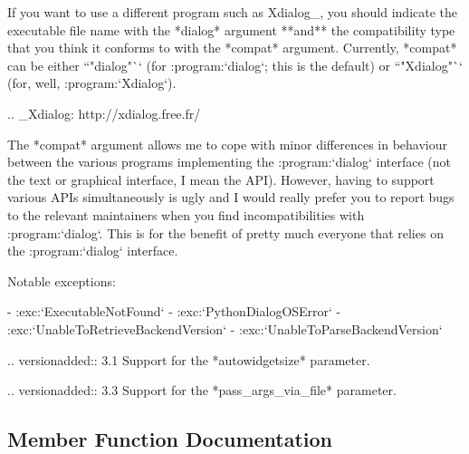 \begin{DoxyVerb}
If you want to use a different program such as Xdialog_, you
should indicate the executable file name with the *dialog*
argument **and** the compatibility type that you think it
conforms to with the *compat* argument. Currently, *compat* can
be either ``"dialog"`` (for :program:`dialog`; this is the
default) or ``"Xdialog"`` (for, well, :program:`Xdialog`).

.. _Xdialog: http://xdialog.free.fr/

The *compat* argument allows me to cope with minor differences
in behaviour between the various programs implementing the
:program:`dialog` interface (not the text or graphical
interface, I mean the API). However, having to support various
APIs simultaneously is ugly and I would really prefer you to
report bugs to the relevant maintainers when you find
incompatibilities with :program:`dialog`. This is for the
benefit of pretty much everyone that relies on the
:program:`dialog` interface.

Notable exceptions:

  - :exc:`ExecutableNotFound`
  - :exc:`PythonDialogOSError`
  - :exc:`UnableToRetrieveBackendVersion`
  - :exc:`UnableToParseBackendVersion`

.. versionadded:: 3.1
   Support for the *autowidgetsize* parameter.

.. versionadded:: 3.3
   Support for the *pass_args_via_file* parameter.\end{DoxyVerb}
 

\subsection{Member Function Documentation}
